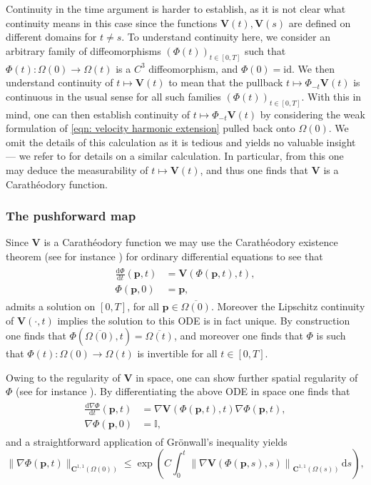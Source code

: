\documentclass[a4paper]{amsart}
\numberwithin{equation}{section}
\newcommand{\grad}{\nabla}
\theoremstyle{plain}
\newcommand{\mbf}[1]{\mathbf{#1}}
\newcommand{\mbb}[1]{\mathbb{#1}}
\begin{document}
Continuity in the time argument is harder to establish, as it is not clear what continuity means in this case since the functions $\mbf{V}(t), \mbf{V}(s)$ are defined on different domains for $t \neq s$.
To understand continuity here, we consider an arbitrary family of diffeomorphisms $(\Phi(t))_{t \in [0,T]}$ such that $\Phi(t): \Omega(0) \rightarrow \Omega(t)$ is a $C^3$ diffeomorphism, and $\Phi(0) = \mathrm{id}$.
We then understand continuity of $t \mapsto \mbf{V}(t)$ to mean that the pullback $t \mapsto \Phi_{-t} \mbf{V}(t)$ is continuous in the usual sense for all such families $(\Phi(t))_{t \in [0,T]}$.
With this in mind, one can then establish continuity of $t \mapsto \Phi_{-t} \mbf{V}(t)$ by considering the weak formulation of \eqref{eqn: velocity harmonic extension} pulled back onto $\Omega(0)$.
We omit the details of this calculation as it is tedious and yields no valuable insight --- we refer to \cite[Appendix A]{elliott2024navier} for details on a similar calculation.
In particular, from this one may deduce the measurability of $t \mapsto \mbf{V}(t)$, and thus one finds that $\mbf{V}$ is a Carath\'eodory function.

\subsubsection{The pushforward map}
Since $\mbf{V}$ is a Carath\'eodory function we may use the Carath\'eodory existence theorem (see for instance \cite{hale2009ordinary}) for ordinary differential equations to see that
\begin{gather}
	\begin{aligned}
		\frac{\mathrm{d} \Phi}{\mathrm{d}t}(\mbf{p},t) &= \mbf{V}(\Phi(\mbf{p},t),t),\\
		\Phi(\mbf{p},0) &= \mbf{p},
	\end{aligned}
	\label{eqn: parametrisation defn}
\end{gather}
admits a solution on $[0,T]$, for all $\mbf{p} \in \overline{\Omega(0)}$.
Moreover the Lipschitz continuity of $\mbf{V}(\cdot, t)$ implies the solution to this ODE is in fact unique.
By construction one finds that $\Phi(\overline{\Omega(0)},t) = \overline{\Omega(t)}$, and moreover one finds that $\Phi$ is such that $\Phi(t): \Omega(0) \rightarrow \Omega(t)$ is invertible for all $t \in [0, T]$.

Owing to the regularity of $\mbf{V}$ in space, one can show further spatial regularity of $\Phi$ (see for instance \cite[\S 32]{arnold1992ordinary}).
By differentiating the above ODE in space one finds that
\begin{gather*}
	\begin{aligned}
		\frac{\mathrm{d} \grad \Phi}{\mathrm{d}t}(\mbf{p},t) &= \grad\mbf{V}(\Phi(\mbf{p},t),t) \grad \Phi(\mbf{p},t),\\
		\grad \Phi(\mbf{p},0) &= \mbb{I},
	\end{aligned}
\end{gather*}
and a straightforward application of Gr\"onwall's inequality yields
\[ \|\grad \Phi(\mbf{p},t)\|_{\mbf{C}^{1,1}(\Omega(0))} \leq \exp \left(C \int_0^t \left\| \grad \mbf{V}(\Phi(\mbf{p},s),s) \right\|_{\mbf{C}^{1,1}(\Omega(s))} \, \mathrm{d}s \right), \]
\end{document}
